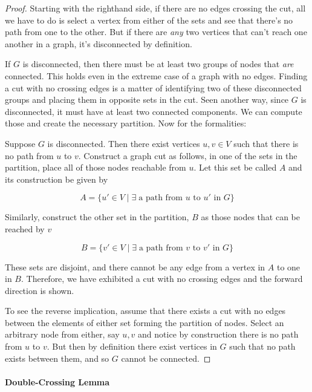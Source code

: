 \documentclass{standalone}
\begin{document}
\begin{proof}
  Starting with the righthand side, if there are no edges crossing the cut, all
  we have to do is select a vertex from either of the sets and see that there's
  no path from one to the other. But if there are \emph{any} two vertices that
  can't reach one another in a graph, it's disconnected by definition.

  If $G$ is disconnected, then there must be at least two groups of nodes that
  \emph{are} connected. This holds even in the extreme case of a graph with no
  edges. Finding a cut with no crossing edges is a matter of identifying two of
  these disconnected groups and placing them in opposite sets in the cut. Seen
  another way, since $G$ is disconnected, it must have at least two connected
  components. We can compute those and create the necessary partition. Now for
  the formalities:

  Suppose $G$ is disconnected. Then there exist vertices $u, v \in V$ such that
  there is no path from $u$ to $v$. Construct a graph cut as follows, in one of
  the sets in the partition, place all of those nodes reachable from $u$. Let
  this set be called $A$ and its construction be given by

  \[
    A = \{u' \in V \mid \exists \; \text{a path from $u$ to $u'$ in $G$} \}
  \]

  Similarly, construct the other set in the partition, $B$ as those nodes that
  can be reached by $v$

  \[
    B = \{v' \in V \mid \exists \; \text{a path from $v$ to $v'$ in $G$} \}
  \]

  These sets are disjoint, and there cannot be any edge from a vertex in $A$ to
  one in $B$. Therefore, we have exhibited a cut with no crossing edges and the
  forward direction is shown.

  To see the reverse implication, assume that there exists a cut with no edges
  between the elements of either set forming the partition of nodes. Select an
  arbitrary node from either, say $u, v$ and notice by construction there is no
  path from $u$ to $v$. But then by definition there exist vertices in $G$ such
  that no path exists between them, and so $G$ cannot be connected.
\end{proof}

\paragraph{Double-Crossing Lemma}
\end{document}
